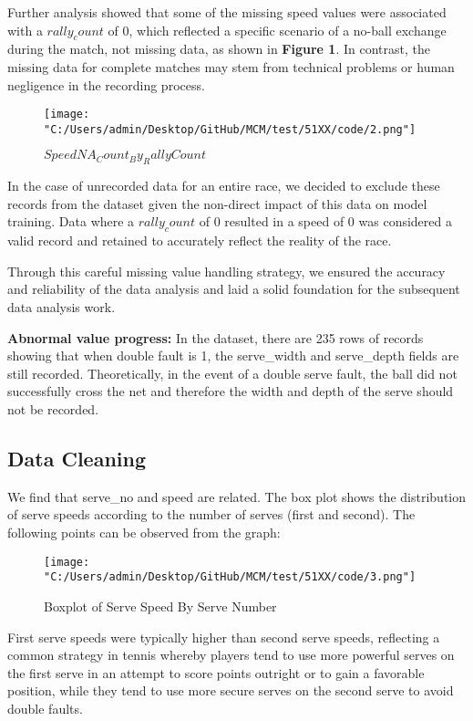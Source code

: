 \documentclass{mcmthesis}
\begin{document}
    Further analysis showed that some of the missing speed values were associated with a
$rally_count$ of 0, which reflected a specific scenario of a no-ball exchange during the match, not
missing data, as shown in {\bf Figure 1}. In contrast, the missing data for complete matches may stem
from technical problems or human negligence in the recording process.

\begin{figure}[h]   
\centering          
\texttt{[image: "C:/Users/admin/Desktop/GitHub/MCM/test/51XX/code/2.png"]}
\caption{$SpeedNA_Count_By_RallyCount$} \label{fig2}    
\end{figure} 
\newpage

    In the case of unrecorded data for an entire race, we decided to exclude these records from
the dataset given the non-direct impact of this data on model training. Data where a $rally_count$ of
0 resulted in a speed of 0 was considered a valid record and retained to accurately reflect the
reality of the race.

    Through this careful missing value handling strategy, we ensured the accuracy and reliability
of the data analysis and laid a solid foundation for the subsequent data analysis work. 

    {\bf Abnormal value progress:} In the dataset, there are 235 rows of records showing that when
double fault is 1, the serve\_width and serve\_depth fields are still recorded. Theoretically, in the
event of a double serve fault, the ball did not successfully cross the net and therefore the width and
depth of the serve should not be recorded.

\subsection{Data Cleaning}

    We find that serve\_no and speed are related. The box plot shows the distribution of serve
speeds according to the number of serves (first and second). The following points can be observed
from the graph:

\begin{figure}[h]   
\centering          
\texttt{[image: "C:/Users/admin/Desktop/GitHub/MCM/test/51XX/code/3.png"]}
\caption{Boxplot of Serve Speed By Serve Number} \label{fig3}    
\end{figure} 
\newpage

    First serve speeds were typically higher than second serve speeds, reflecting a common
strategy in tennis whereby players tend to use more powerful serves on the first serve in an
attempt to score points outright or to gain a favorable position, while they tend to use more secure
serves on the second serve to avoid double faults. 
\end{document}
